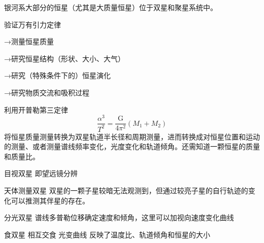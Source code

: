 \documentclass[11pt, a4paper, oneside, onecolumn]{ctexart}
\numberwithin{equation}{subsection}
\begin{document}
银河系大部分的恒星（尤其是大质量恒星）位于双星和聚星系统中。

验证万有引力定律

→测量恒星质量

→研究恒星结构（形状、大小、大气）

→研究（特殊条件下的）恒星演化

→研究物质交流和吸积过程

利用开普勒第三定律
\begin{equation}
\frac{\alpha^3}{T^2}=\frac{\mathrm{G}}{4\pi^2}(M_1+M_2)
\end{equation}
将恒星质量测量转换为双星轨道半长径和周期测量，进而转换成对恒星位置和运动的测量、或者测量谱线频率变化，光度变化和轨道倾角。还需知道一颗恒星的质量和质量比。

目视双星 即望远镜分辨

天体测量双星 双星的一颗子星较暗无法观测到，但通过较亮子星的自行轨迹的变化可以推测其伴星的存在。

分光双星 谱线多普勒位移确定速度和倾角，这里可以加视向速度变化曲线 

食双星 相互交食 光变曲线 反映了温度比、轨道倾角和恒星的大小


\printbibliography
\end{document}
